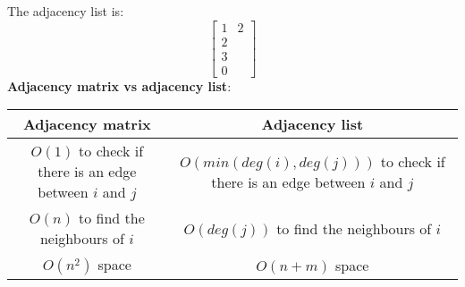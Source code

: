 \documentclass[onecolumn]{report}
\begin{document}
The adjacency list is:\\
\begin{equation*}
    \begin{bmatrix}
    1 & 2\\
    2\\
    3\\
    0
    \end{bmatrix}
\end{equation*}
\textbf{Adjacency matrix vs adjacency list}:\\
\begin{table}[H]
\centering
\begin{tabular}{|c|c|}
\hline
Adjacency matrix & Adjacency list\\
\hline
$O(1)$ to check if there is an edge between $i$ and $j$ & $O(min(deg(i),deg(j)))$ to check if there is an edge between $i$ and $j$\\
\hline
$O(n)$ to find the neighbours of $i$ & $O(deg(j))$ to find the neighbours of $i$\\
\hline
$O(n^2)$ space & $O(n+m)$ space\\
\hline
\end{tabular}
\end{table}
\end{document}
